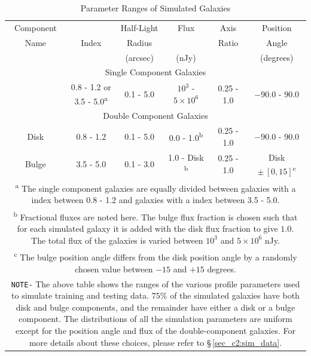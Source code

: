 \begin{table}[htbp]
    \centering
    \caption{Parameter Ranges of Simulated Galaxies  \label{tab_c2:sim_para}}
    \begin{tabular}{cccccc}
    \hline
    \hline
    Component & \sersic{} & Half-Light & Flux & Axis & Position \\ 
    Name &  Index & Radius & & Ratio & Angle \\
     &  & (arcsec) & (nJy) &  & (degrees) \\
     \hline 
     \hline
     \multicolumn{6}{c}{Single Component Galaxies} \\
     \hline
      & 0.8 - 1.2 or 3.5 - 5.0\textsuperscript{a} & 0.1 - 5.0 & $10^3$ - $5\times10^6$ & 0.25 - 1.0 & $-90.0$ - $90.0$ \\
     \hline
     \hline
     \multicolumn{6}{c}{Double Component Galaxies} \\
     \hline
     Disk & 0.8 - 1.2 & 0.1 - 5.0 & 0.0 - 1.0\textsuperscript{b} & 0.25 - 1.0 & $-90.0$ - 90.0\\
     Bulge & 3.5 - 5.0 & 0.1 - 3.0 & 1.0 - Disk \textsuperscript{b} & 0.25 - 1.0 &  Disk $\pm\,[0,15]$\textsuperscript{c} \\ 
     \hline
     \multicolumn{6}{p{0.95\textwidth}}{\vskip 0.01cm \small \textsuperscript{a} The single component galaxies are equally divided between galaxies with a \sersic{} index between 0.8 - 1.2 and galaxies with a \sersic{} index between 3.5 - 5.0.} \\
     \multicolumn{6}{p{0.95\textwidth}}{\textsuperscript{b} Fractional fluxes are noted here. The bulge flux fraction is chosen such that for each simulated galaxy it is added with the disk flux fraction to give $1.0$. The total flux of the galaxies is varied between $10^3$ and $5\times10^6$ nJy.} \\
     \multicolumn{6}{p{0.95\textwidth}}{\textsuperscript{c} The bulge position angle differs from the disk position angle by a randomly chosen value between $-15$ and $+15$ degrees.} \\
     \multicolumn{6}{p{0.95\textwidth}}{\texttt{NOTE-} The above table shows the ranges of the various \sersic{} profile parameters used to simulate training and testing data. $75\%$ of the simulated galaxies have both disk and bulge components, and the remainder have either a disk or a bulge component. The distributions of all the simulation parameters are uniform except for the position angle and flux of the double-component galaxies. For more details about these choices, please refer to  \S\,\ref{sec_c2:sim_data}.} \\
    \end{tabular}
\end{table}


